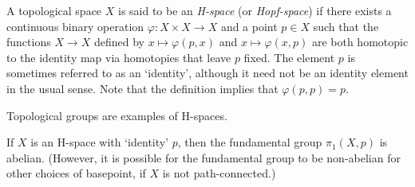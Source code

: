 \documentclass[12pt]{article}
\begin{document}

A topological space $X$ is said to be an \emph{H-space} (or \emph{Hopf-space})
if there exists
a continuous binary operation $\varphi\colon X\times X\to X$ 
and a point $p\in X$ such that the functions 
$X\to X$ defined by $x\mapsto\varphi(p,x)$ and $x\mapsto\varphi(x,p)$
are both homotopic to the identity map via homotopies that leave $p$ fixed.
The element $p$ is sometimes referred to as an `identity',
although it need not be an identity element in the usual sense.
Note that the definition implies that $\varphi(p,p)=p$.

Topological groups are examples of H-spaces.

If $X$ is an H-space with `identity' $p$,
then the fundamental group $\pi_1(X,p)$ is abelian.
(However, it is possible for the fundamental group to be non-abelian
for other choices of basepoint, if $X$ is not path-connected.)


\end{document}
